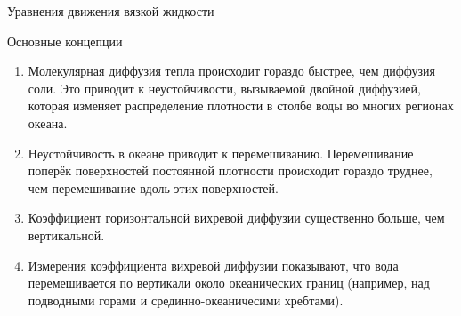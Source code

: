 \begin{chapter}{Уравнения движения вязкой жидкости}
\begin{section}{Основные концепции}
\begin{enumerate}
\item
Молекулярная диффузия тепла происходит гораздо быстрее, чем диффузия соли. 
Это приводит к неустойчивости, вызываемой двойной диффузией, которая
изменяет распределение плотности в столбе воды во многих регионах
океана.

\item
Неустойчивость в океане приводит к перемешиванию. Перемешивание
поперёк поверхностей постоянной плотности происходит гораздо труднее, чем
перемешивание вдоль этих поверхностей.

\item
Коэффициент горизонтальной вихревой диффузии существенно больше, чем
вертикальной.
%


\item
Измерения коэффициента вихревой диффузии показывают, что вода
перемешивается по вертикали около океанических границ (например, над
подводными горами и срединно-океаничесими хребтами). 
%
\end{enumerate} 
\end{section}
\end{chapter}
